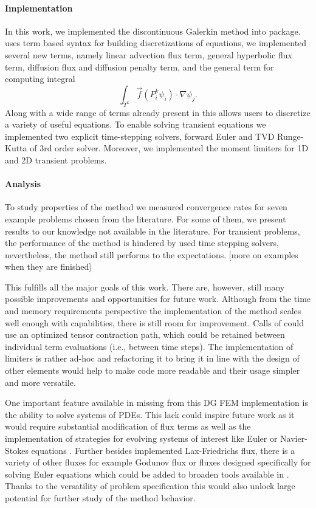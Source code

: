 \paragraph{Implementation}
In this work, we implemented the discontinuous Galerkin method into \sfepy{} 
package. \sfepy{} uses term based syntax for building discretizations of 
equations, we implemented several new terms, namely linear advection flux 
term, general hyperbolic flux term, diffusion flux and diffusion penalty term, 
and the general term for computing integral
$$
\int_{T^k} \vec{f}(P_i^k\psi_i)\cdot\nabla\psi_j. 
$$
Along with a wide range of terms already present in \sfepy{} this allows users 
to discretize a variety of useful equations. To enable solving transient 
equations we implemented two explicit time-stepping solvers, forward Euler and 
TVD Runge-Kutta of 3rd order solver. Moreover, we implemented the moment 
limiters for 1D and 2D transient problems.

\paragraph{Analysis}
To study properties of the method we measured convergence rates for seven 
example problems chosen from the literature. For some of them, we present 
results to our knowledge not available in the literature. For transient 
problems, the performance of the method is hindered by used time stepping 
solvers, nevertheless, the method still performs to the expectations.
[\todo more on examples when they are finished]

This fulfills all the major goals of this work. There are, however, still many 
possible improvements and opportunities for future work. Although from the 
time and memory requirements perspective the implementation of the method 
scales well enough with \sfepy{} capabilities, there is still room for 
improvement. Calls of  could use an optimized tensor 
contraction path, which could be retained between individual term evaluations 
(i.e., between time steps). The implementation of limiters is rather ad-hoc and 
refactoring it to bring it in line with the design of other \sfepy{} elements 
would help to make code more readable and their usage simpler and more 
versatile. 

One important feature available in \sfepy{} missing from this DG FEM 
implementation is the ability to solve systems of PDEs. This lack could 
inspire future work as it would require substantial modification of flux terms 
as well as the implementation of  strategies for evolving systems of interest 
like Euler or Navier-Stokes equations \cite{Hesthaven2008}. Further besides 
implemented Lax-Friedrichs flux, there is a variety of other fluxes for 
example Godunov flux \cite{DiPietro2012} or fluxes designed specifically for 
solving Euler equations \cite[Section 3.3]{Kucera} which could be added to 
broaden tools available in \sfepy{}. Thanks to the versatility of problem 
specification this would also unlock large potential for further study of the 
method behavior.